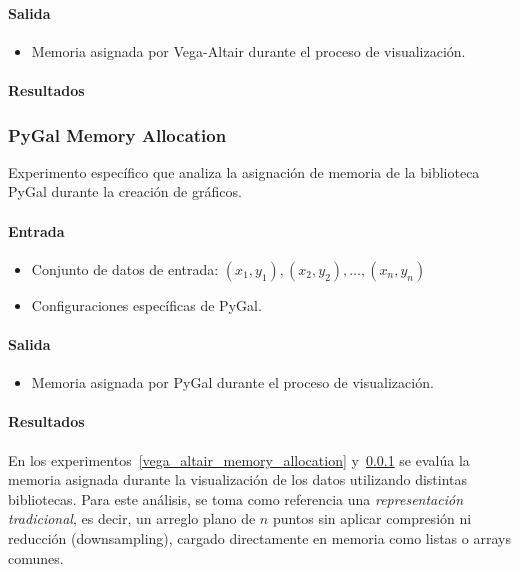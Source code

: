 \paragraph{Salida}
\begin{itemize}
    \item Memoria asignada por Vega-Altair durante el proceso de visualización.
\end{itemize}

\newpage
\paragraph{Resultados}
\vspace{0.5em}
\noindent
\VegaAltairMemoryAllocation
\newpage


\subsubsection{PyGal Memory Allocation}
\label{pygal_memory_allocation}

Experimento específico que analiza la asignación de memoria de la biblioteca PyGal durante la creación de gráficos.

\paragraph{Entrada}
\begin{itemize}
    \item Conjunto de datos de entrada: \( (x_1, y_1), (x_2, y_2), \ldots, (x_n, y_n) \)
    \item Configuraciones específicas de PyGal.
\end{itemize}

\paragraph{Salida}
\begin{itemize}
    \item Memoria asignada por PyGal durante el proceso de visualización.
\end{itemize}

\newpage
\paragraph{Resultados}
\vspace{0.5em}
\noindent
\PyGalMemoryAllocation
\newpage

En los experimentos~\ref{vega_altair_memory_allocation} y~\ref{pygal_memory_allocation} se evalúa la memoria asignada durante la visualización de los datos utilizando distintas bibliotecas. Para este análisis, se toma como referencia una \textit{representación tradicional}, es decir, un arreglo plano de \(n\) puntos sin aplicar compresión ni reducción (downsampling), cargado directamente en memoria como listas o arrays comunes.

